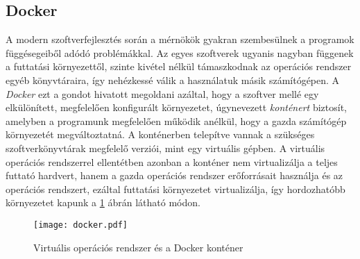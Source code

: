 \subsection{Docker} \label{subs:docker_bevezeto}

A modern szoftverfejlesztés során a mérnökök gyakran szembesülnek a programok függésegeiből adódó problémákkal. Az egyes szoftverek ugyanis nagyban függenek a futtatási környezettől, szinte kivétel nélkül támaszkodnak az operációs rendszer egyéb könyvtáraira, így nehézkessé válik a használatuk másik számítógépen. A \emph{Docker} ezt a gondot hivatott megoldani azáltal, hogy a szoftver mellé egy elkülönített, megfelelően konfigurált környezetet, úgynevezett \emph{konténert} biztosít, amelyben a programunk megfelelően működik anélkül, hogy a gazda számítógép környezetét megváltoztatná. A konténerben telepítve vannak a szükséges szoftverkönyvtárak megfelelő verziói, mint egy virtuális gépben. A virtuális operációs rendszerrel ellentétben azonban a konténer nem virtualizálja a teljes futtató hardvert, hanem a gazda operációs rendszer erőforrásait használja és az operációs rendszert, ezáltal futtatási környezetet virtualizálja, így hordozhatóbb környezetet kapunk a \ref{fig:docker} ábrán látható módon.

\begin{figure}[h]
\vspace{.5cm}
\texttt{[image: docker.pdf]}
\centering
\vspace{.2cm}
\caption{Virtuális operációs rendszer és a Docker konténer}
\vspace{.5cm}
\label{fig:docker}
\end{figure}

